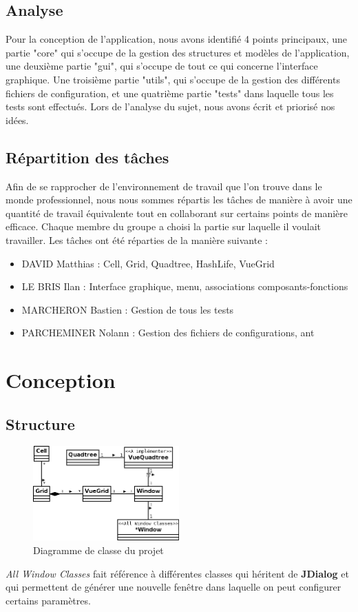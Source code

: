 \documentclass[12pt]{article}
\begin{document}
		\subsection{Analyse}
			Pour la conception de l’application, nous avons identifié 4 points principaux, une partie "core" qui s’occupe de la gestion des structures et modèles de l’application, une deuxième partie "gui", qui s’occupe de tout ce qui concerne l’interface graphique. Une troisième partie "utils", qui s'occupe de la gestion des différents fichiers de configuration, et une quatrième partie "tests" dans laquelle tous les tests sont effectués. Lors de l’analyse du sujet, nous avons écrit et priorisé nos idées.
		\subsection{Répartition des tâches}
			Afin de se rapprocher de l'environnement de travail que l'on trouve dans le monde professionnel, nous nous sommes répartis les tâches de manière à avoir une quantité de travail équivalente tout en collaborant sur certains points de manière efficace. Chaque membre du groupe a choisi la partie sur laquelle il voulait travailler. Les tâches ont été réparties de la manière suivante :
			\begin{itemize}
				\item DAVID Matthias : Cell, Grid, Quadtree, HashLife, VueGrid
				\item LE BRIS Ilan : Interface graphique, menu, associations composants-fonctions
				\item MARCHERON Bastien : Gestion de tous les tests
				\item PARCHEMINER Nolann : Gestion des fichiers de configurations, ant
			\end{itemize}

	
	\section{Conception}
		\subsection{Structure}
			\begin{figure}[!h]
				\centering
				\includegraphics[width=0.5\textwidth]{images/diagramme.png}
				\caption{Diagramme de classe du projet}
			\end{figure}
			\emph{All Window Classes} fait référence à différentes classes qui héritent de \textbf{JDialog} et qui permettent de générer une nouvelle fenêtre dans laquelle on peut configurer certains paramètres.
		
\end{document}
